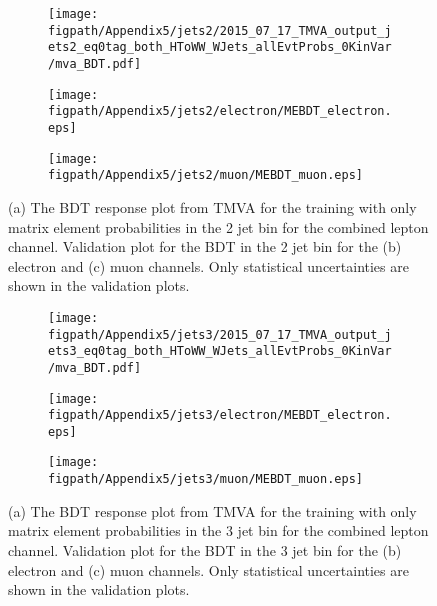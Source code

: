 \begin{figure}[!hbt]
    \centering
    \begin{subfigure}[t]{0.317\textwidth}
        \texttt{[image: \\figpath/Appendix5/jets2/2015\_07\_17\_TMVA\_output\_jets2\_eq0tag\_both\_HToWW\_WJets\_allEvtProbs\_0KinVar/mva\_BDT.pdf]}
        \caption{}
        \label{fig:MEBDT_Response_2j0B_TMVA}
    \end{subfigure}
    \begin{subfigure}[t]{0.317\textwidth}
        \texttt{[image: \\figpath/Appendix5/jets2/electron/MEBDT\_electron.eps]}
        \caption{}
        \label{fig:MEBDT_jets2_electron_noSys}
    \end{subfigure}
    \begin{subfigure}[t]{0.317\textwidth}
        \texttt{[image: \\figpath/Appendix5/jets2/muon/MEBDT\_muon.eps]}
        \caption{}
        \label{fig:MEBDT_jets2_muon_noSys}
    \end{subfigure}
    \caption{(a) The BDT response plot from TMVA for the training with only matrix element probabilities in the 2 jet bin for the combined lepton channel. Validation plot for the BDT in the 2 jet bin for the (b) electron and (c) muon channels. Only statistical uncertainties are shown in the validation plots.}
    \label{fig:MEBDT_Comparison_jets2}
\end{figure}

\begin{figure}[!hbt]
    \centering
    \begin{subfigure}[t]{0.317\textwidth}
        \texttt{[image: \\figpath/Appendix5/jets3/2015\_07\_17\_TMVA\_output\_jets3\_eq0tag\_both\_HToWW\_WJets\_allEvtProbs\_0KinVar/mva\_BDT.pdf]}
        \caption{}
        \label{fig:MEBDT_Response_3j0B_TMVA}
    \end{subfigure}
    \begin{subfigure}[t]{0.317\textwidth}
        \texttt{[image: \\figpath/Appendix5/jets3/electron/MEBDT\_electron.eps]}
        \caption{}
        \label{fig:MEBDT_jets3_electron_noSys}
    \end{subfigure}
    \begin{subfigure}[t]{0.317\textwidth}
        \texttt{[image: \\figpath/Appendix5/jets3/muon/MEBDT\_muon.eps]}
        \caption{}
        \label{fig:MEBDT_jets3_muon_noSys}
    \end{subfigure}
    \caption{(a) The BDT response plot from TMVA for the training with only matrix element probabilities in the 3 jet bin for the combined lepton channel. Validation plot for the BDT in the 3 jet bin for the (b) electron and (c) muon channels. Only statistical uncertainties are shown in the validation plots.}
    \label{fig:MEBDT_Comparison_jets3}
\end{figure}

